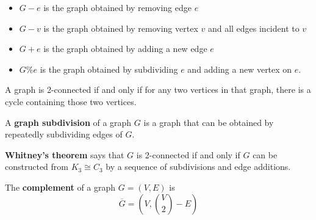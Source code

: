 \documentclass[12pt]{article}
\begin{document}
\begin{itemize}
    \item $G-e$ is the graph obtained by removing edge $e$
    \item $G-v$ is the graph obtained by removing vertex $v$ and all edges incident to $v$
    \item $G+e$ is the graph obtained by adding a new edge $e$
    \item $G\%e$ is the graph obtained by subdividing $e$ and adding a new vertex on $e$.
\end{itemize}
\par
A graph is 2-connected if and only if for any two vertices in that graph, there is a cycle containing those two vertices.
\par
A \textbf{graph subdivision} of a graph $G$ is a graph that can be obtained by repeatedly subdividing edges of $G$.
\par
\textbf{Whitney's theorem} says that $G$ is 2-connected if and only if $G$ can be constructed from $K_3 \cong C_3$ by a sequence of subdivisions and edge additions.
\par
The \textbf{complement} of a graph $G=(V,E)$ is
\[ \overline{G} = \left( V, \binom{V}{2}-E \right) \]
\end{document}
